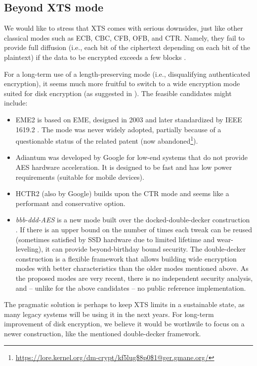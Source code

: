 \documentclass[a4paper]{article}
\begin{document}
\subsection*{Beyond XTS mode}
We would like to stress that XTS comes with serious downsides, just like other classical modes such as ECB, CBC, CFB, OFB, and CTR. Namely, they fail to provide full diffusion (i.e., each bit of the ciphertext depending on each bit of the plaintext) if the data to be encrypted exceeds a few blocks \cite{dobraunig2025efficient}.

For a long-term use of a length-preserving mode (i.e., disqualifying authenticated encryption), it seems much more fruitful to switch to a wide encryption mode suited for disk encryption (as suggested in \cite{rogaway2011evaluation}). The feasible candidates might include:
\begin{itemize}
    \item EME2 is based on EME, designed in 2003 and later standardized by IEEE 1619.2 \cite{eme-ieee}. The mode was never widely adopted, partially because of a questionable status of the related patent (now abandoned\footnote{\url{https://lore.kernel.org/dm-crypt/kf5lug$8p0$1@ger.gmane.org/}}).
    \item Adiantum \cite{crowley2018adiantum} was developed by Google for low-end systems that do not provide AES hardware acceleration. It is designed to be fast and has low power requirements (suitable for mobile devices).
    \item HCTR2 \cite{crowley2021hctr2} (also by Google) builds upon the CTR mode and seems like a performant and conservative option.
    \item \emph{bbb-ddd-AES} \cite{dobraunig2025efficient} is a new mode built over the docked-double-decker construction \cite{gunsing2019deck}. If there is an upper bound on the number of times each tweak can be reused (sometimes satisfied by SSD hardware due to limited lifetime and wear-leveling), it can provide beyond-birthday bound security. The double-decker construction is a flexible framework that allows building wide encryption modes with better characteristics than the older modes mentioned above. As the proposed modes are very recent, there is no independent security analysis, and -- unlike for the above candidates -- no public reference implementation.
\end{itemize}

The pragmatic solution is perhaps to keep XTS limits in a sustainable state, as many legacy systems will be using it in the next years. For long-term improvement of disk encryption, we believe it would be worthwile to focus on a newer construction, like the mentioned double-decker framework.
\end{document}
